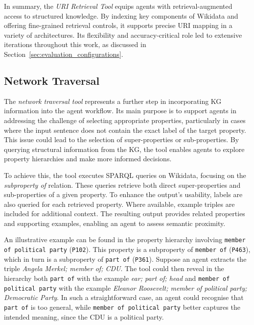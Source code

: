 \documentclass[a4paper,oneside,bibliography=totoc]{scrbook}
\begin{document}
In summary, the \textit{\ac{URI} Retrieval Tool} equips agents with retrieval-augmented access to structured knowledge. By indexing key components of Wikidata and offering fine-grained retrieval controls, it supports precise \ac{URI} mapping in a variety of architectures. Its flexibility and accuracy-critical role led to extensive iterations throughout this work, as discussed in Section~\ref{sec:evaluation_configurations}.

\subsection{Network Traversal}
\label{subsec:network_traversal}

The \textit{network traversal tool} represents a further step in incorporating \ac{KG} information into the agent workflow. Its main purpose is to support agents in addressing the challenge of selecting appropriate properties, particularly in cases where the input sentence does not contain the exact label of the target property. This issue could lead to the selection of super-properties or sub-properties. By querying structural information from the \ac{KG}, the tool enables agents to explore property hierarchies and make more informed decisions.

To achieve this, the tool executes \ac{SPARQL} queries on Wikidata, focusing on the \textit{subproperty of} relation. These queries retrieve both direct super-properties and sub-properties of a given property. To enhance the output's usability, labels are also queried for each retrieved property. Where available, example triples are included for additional context. The resulting output provides related properties and supporting examples, enabling an agent to assess semantic proximity.

An illustrative example can be found in the property hierarchy involving \texttt{member of political party} (\texttt{P102}). This property is a subproperty of \texttt{member of} (\texttt{P463}), which in turn is a subproperty of \texttt{part of} (\texttt{P361}). Suppose an agent extracts the triple \textit{Angela Merkel; member of; CDU}. The tool could then reveal in the hierarchy both \texttt{part of} with the example \textit{ear; part of; head} and \texttt{member of political party} with the example \textit{Eleanor Roosevelt; member of political party; Democratic Party}. In such a straightforward case, an agent could recognise that \texttt{part of} is too general, while \texttt{member of political party} better captures the intended meaning, since the CDU is a political party.
\end{document}
